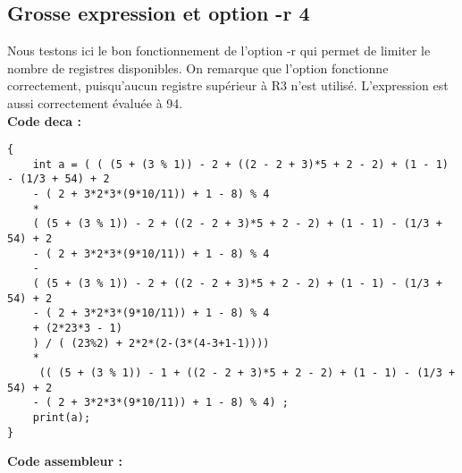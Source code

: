 \documentclass[a4,12pt]{article}
\begin{document}
\subsection{Grosse expression et option -r 4}
Nous testons ici le bon fonctionnement de l'option -r qui permet de limiter le nombre de registres disponibles. On remarque que l'option fonctionne correctement, puisqu'aucun registre supérieur à R3 n'est utilisé. L'expression est aussi correctement évaluée à 94. \\
\textbf{Code deca :} 
\begin{verbatim}
{
    int a = ( ( (5 + (3 % 1)) - 2 + ((2 - 2 + 3)*5 + 2 - 2) + (1 - 1) - (1/3 + 54) + 2
    - ( 2 + 3*2*3*(9*10/11)) + 1 - 8) % 4
    *
    ( (5 + (3 % 1)) - 2 + ((2 - 2 + 3)*5 + 2 - 2) + (1 - 1) - (1/3 + 54) + 2
    - ( 2 + 3*2*3*(9*10/11)) + 1 - 8) % 4
    -
    ( (5 + (3 % 1)) - 2 + ((2 - 2 + 3)*5 + 2 - 2) + (1 - 1) - (1/3 + 54) + 2
    - ( 2 + 3*2*3*(9*10/11)) + 1 - 8) % 4
    + (2*23*3 - 1)
    ) / ( (23%2) + 2*2*(2-(3*(4-3+1-1))))
    *
     (( (5 + (3 % 1)) - 1 + ((2 - 2 + 3)*5 + 2 - 2) + (1 - 1) - (1/3 + 54) + 2
    - ( 2 + 3*2*3*(9*10/11)) + 1 - 8) % 4) ;
    print(a);
}
\end{verbatim}
\textbf{Code assembleur :} 
\end{document}
